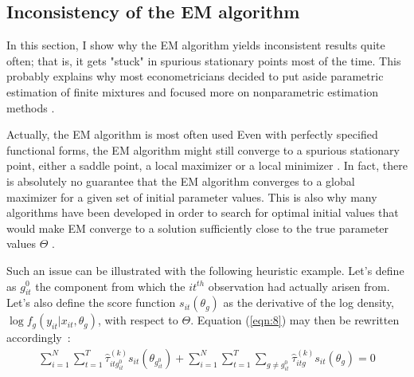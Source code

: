 \documentclass[11pt,letter]{article}
\begin{document}
\subsection{Inconsistency of the EM algorithm}
In this section, I show why the EM algorithm yields inconsistent results quite often; that is, it gets "stuck" in spurious stationary points most of the time. This probably explains why most econometricians decided to put aside parametric estimation of finite mixtures and focused more on nonparametric estimation methods \citep{compiani_using_2016}. 
\par
Actually, the EM algorithm is most often used Even with perfectly specified functional forms, the EM algorithm might still converge to a spurious stationary point, either a saddle point, a local maximizer or a local minimizer \citep{mclachlan_em_2008}. In fact, there is absolutely no guarantee that the EM algorithm converges to a global maximizer for a given set of initial parameter values. This is also why many algorithms have been developed in order to search for optimal initial values that would make EM converge to a solution sufficiently close to the true parameter values $\Theta$ \citep{fruhwirth-schnatter_em_2019}.
\par
Such an issue can be illustrated with the following heuristic example. Let's define as $g_{it}^0$ the component from which the $\textit{it}^{th}$ observation had actually arisen from. Let's also define the score function $s_{it}(\theta_g)$ as the derivative of the log density, $\log f_g(y_{it}|x_{it},\theta_g)$, with respect to $\Theta$. Equation (\ref{eqn:8}) may then be rewritten accordingly~:
\begin{align} \label{eqn:9}
\sum_{i=1}^N \sum_{t=1}^T \hat{\tau}^{(k)}_{itg_{it}^{0}} s_{it}(\theta_{g_{it}^0}) + \sum_{i=1}^N \sum_{t=1}^T \sum_{g\ne g_{it}^0} \hat{\tau}^{(k)}_{itg} s_{it}(\theta_{g}) = 0
\end{align}
\end{document}
